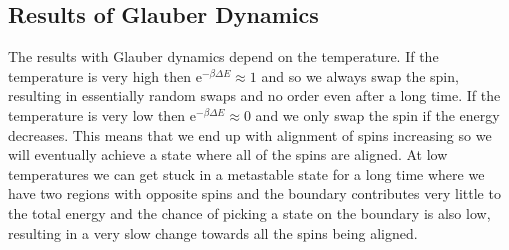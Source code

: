 \documentclass[fleqn]{NotesClass}
\newcommand*{\e}{\mathrm{e}}
\begin{document}
    \subsection{Results of Glauber Dynamics}
    The results with Glauber dynamics depend on the temperature.
    If the temperature is very high then \(\e^{-\beta\Delta E} \approx 1\) and so we always swap the spin, resulting in essentially random swaps and no order even after a long time.
    If the temperature is very low then \(\e^{-\beta\Delta E} \approx 0\) and we only swap the spin if the energy decreases.
    This means that we end up with alignment of spins increasing so we will eventually achieve a state where all of the spins are aligned.
    At low temperatures we can get stuck in a metastable state for a long time where we have two regions with opposite spins and the boundary contributes very little to the total energy and the chance of picking a state on the boundary is also low, resulting in a very slow change towards all the spins being aligned.
    
\end{document}
